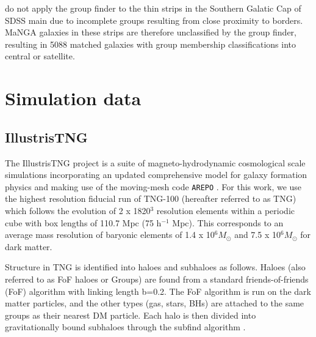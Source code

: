 \documentclass[fleqn,usenatbib]{mnras}
\begin{document}


\citet{lim2017} do not apply the group finder to the thin strips in the Southern Galatic Cap of SDSS main due to incomplete groups resulting from close proximity to borders. MaNGA galaxies in these strips are therefore unclassified by the group finder, resulting in 5088 matched galaxies with group membership classifications into central or satellite. 

\section{Simulation data} \label{sec:sim_data}
\subsection{IllustrisTNG}
The IllustrisTNG project \citep{marinacci18,naiman18,nelson18,pillepich18b,springel18} is a suite of magneto-hydrodynamic cosmological scale simulations incorporating an updated comprehensive model for galaxy formation physics \citep[as decribed in; ][]{weinberger17,pillepich18a} and making use of the moving-mesh code \texttt{AREPO} \citep{springel10,pakmor11,pakmor13}. For this work, we use the highest resolution fiducial run of TNG-100 (hereafter referred to as TNG) which follows the evolution of 2 x 1820$^3$ resolution elements within a periodic cube with box lengths of 110.7 Mpc (75 h$^{-1}$ Mpc). This corresponds to an average mass resolution of baryonic elements of 1.4 x 10$^6 M_{\odot}$ and 7.5 x 10$^6 M_{\odot}$ for dark matter. 

Structure in TNG is identified into haloes and subhaloes as follows. Haloes (also referred to as FoF haloes or Groups) are found from a standard friends-of-friends (FoF) algorithm \citep{davis85} with linking length b=0.2. The FoF algorithm is run on the dark matter particles, and the other types (gas, stars, BHs) are attached to the same groups as their nearest DM particle. Each halo is then divided into gravitationally bound subhaloes through the subfind algorithm \citep{springel01}.
\end{document}
